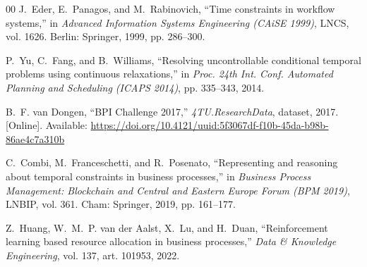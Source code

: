 \documentclass[conference]{IEEEtran}
\begin{document}
\begin{thebibliography}{00}
J.~Eder, E.~Panagos, and M.~Rabinovich, ``Time constraints in workflow systems,'' in \emph{Advanced Information Systems Engineering (CAiSE 1999)}, LNCS, vol. 1626. Berlin: Springer, 1999, pp. 286--300.

P.~Yu, C.~Fang, and B.~Williams, ``Resolving uncontrollable conditional temporal problems using continuous relaxations,'' in \emph{Proc. 24th Int. Conf. Automated Planning and Scheduling (ICAPS 2014)}, pp. 335--343, 2014.

B.~F. van Dongen, ``BPI Challenge 2017,'' \emph{4TU.ResearchData}, dataset, 2017. [Online]. Available: \url{https://doi.org/10.4121/uuid:5f3067df-f10b-45da-b98b-86ae4c7a310b}

C.~Combi, M.~Franceschetti, and R.~Posenato, ``Representing and reasoning about temporal constraints in business processes,'' in \emph{Business Process Management: Blockchain and Central and Eastern Europe Forum (BPM 2019)}, LNBIP, vol. 361. Cham: Springer, 2019, pp. 161--177.

Z.~Huang, W.~M.~P. van der Aalst, X.~Lu, and H.~Duan, ``Reinforcement learning based resource allocation in business processes,'' \emph{Data \& Knowledge Engineering}, vol. 137, art. 101953, 2022.

\end{thebibliography}
\end{document}
